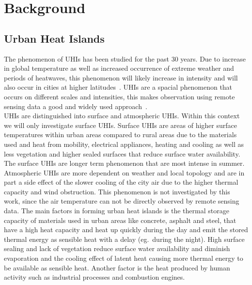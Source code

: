 \section{Background}
\subsection{Urban Heat Islands}
The phenomenon of \acp{UHI} has been studied for the past 30 years. 
Due to increase in global temperature as well as increased occurrence of extreme weather and periods of heatwaves, this phenomenon will likely increase in intensity and will also occur in cities at higher latitudes~\cite{Sachindra2016}\cite[p.~904]{Wilby2008}.
\acp{UHI} are a spacial phenomenon that occurs on different scales and intensities, this makes observation using remote sensing data a good and widely used approach~\cite{Weng2003}.\\
\acp{UHI} are distinguished into surface and atmospheric \acp{UHI}.
Within this context we will only investigate surface \acp{UHI}. 
Surface \acp{UHI} are areas of higher surface temperatures within urban areas compared to rural areas due to the materials used and heat from mobility, electrical appliances, heating and cooling as well as less vegetation and higher sealed surfaces that reduce surface water availability\cite[pp. 7-12]{EPA2008}. 
The surface \acp{UHI} are longer term phenomenon that are most intense in summer. 
Atmospheric \acp{UHI} are more dependent on weather and local topology and are in part a side effect of the slower cooling of the city air due to the higher thermal capacity and wind obstruction.
This phenomenon is not investigated by this work, since the air temperature can not be directly observed by remote sensing data.
The main factors in forming urban heat islands is the thermal storage capacity of materials used in urban areas like concrete, asphalt and steel, that have a high heat capacity and heat up quickly during the day and emit the stored thermal energy as sensible heat with a delay (eg.~during the night)\cite{Ramamurthy2014}. 
High surface sealing and lack of vegetation reduce surface water availability and diminish evaporation and the cooling effect of latent heat causing more thermal energy to be available as sensible heat. %
Another factor is the heat produced by human activity such as industrial processes and combustion engines.
